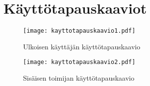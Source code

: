 \chapter{Käyttötapauskaaviot}
\label{kayttotapaus2}

\begin{figure}[H]
    \centering
    \texttt{[image: kayttotapauskaavio1.pdf]}
    \caption{Ulkoisen käyttäjän käyttötapauskaavio}
    \label{img:kayttotapaus1}
\end{figure}

\begin{figure}
    \texttt{[image: kayttotapauskaavio2.pdf]}
    \caption{Sisäisen toimijan käyttötapauskaavio}
    \label{img:asiakas}
\end{figure}
